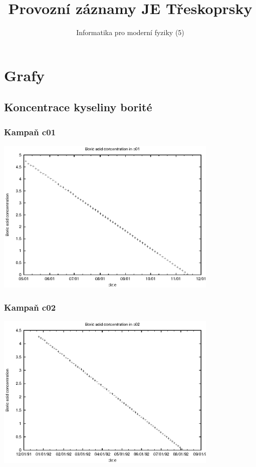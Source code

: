 \documentclass[a4paper,twoside,11pt]{article}
\title{Provozní záznamy JE Třeskoprsky}
\author{Informatika pro moderní fyziky (5)}
\begin{document}
\maketitle

\tableofcontents

\section{Grafy}

\subsection{Koncentrace kyseliny borité}



\subsubsection{Kampaň c01}
\begin{center}
\includegraphics[width=0.8\textwidth]{data_c01_bc.eps}
\end{center}


\subsubsection{Kampaň c02}
\begin{center}
\includegraphics[width=0.8\textwidth]{data_c02_bc.eps}
\end{center}
\end{document}
